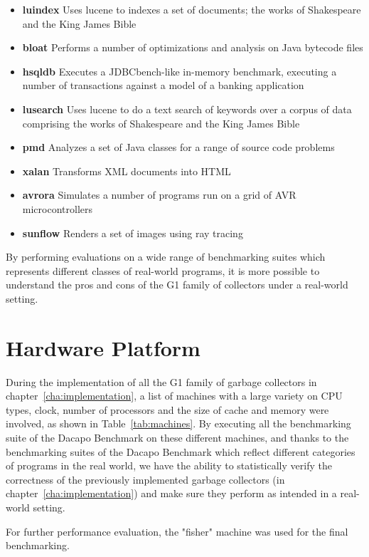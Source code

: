 \begin{itemize}
  \item \textbf{luindex} Uses lucene to indexes a set of documents; the works of Shakespeare and the King James Bible
  \item \textbf{bloat} Performs a number of optimizations and analysis on Java bytecode files
  \item \textbf{hsqldb} Executes a JDBCbench-like in-memory benchmark, executing a number of transactions against a model of a banking application
  \item \textbf{lusearch} Uses lucene to do a text search of keywords over a corpus of data comprising the works of Shakespeare and the King James Bible
  \item \textbf{pmd} Analyzes a set of Java classes for a range of source code problems
  \item \textbf{xalan} Transforms XML documents into HTML
  \item \textbf{avrora} Simulates a number of programs run on a grid of AVR microcontrollers
  \item \textbf{sunflow} Renders a set of images using ray tracing
\end{itemize}

By performing evaluations on a wide range of benchmarking suites which represents different
classes of real-world programs, it is more possible to understand the pros and cons
of the G1 family of collectors under a real-world setting.

\section{Hardware Platform} %
\label{sec:hardware}

During the implementation of all the G1 family of garbage collectors in chapter~\ref{cha:implementation},
a list of machines with a large variety on CPU types, clock, number of processors and
the size of cache and memory were involved, as shown in Table~\ref{tab:machines}.
By executing all the benchmarking suite of the Dacapo Benchmark on these different machines,
and thanks to the benchmarking suites of the Dacapo Benchmark which reflect
different categories of programs in the real world,
we have the ability to statistically verify the correctness of the previously
implemented garbage collectors (in chapter~\ref{cha:implementation})
and make sure they perform as intended in a real-world setting.

For further performance evaluation, the "fisher" machine was used for the final benchmarking.

